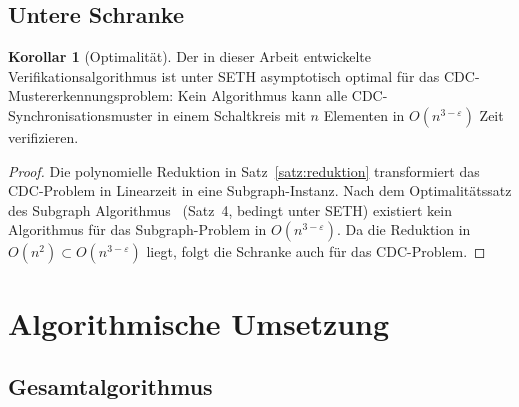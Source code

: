 ﻿\documentclass[a4paper,12pt]{article}
\theoremstyle{definition}
\newtheorem{korollar}{Korollar}
\begin{document}
	\subsection{Untere Schranke}
	
	\begin{korollar}[Optimalit\"at]
		Der in dieser Arbeit entwickelte Verifikationsalgorithmus ist unter SETH
		asymptotisch optimal f\"ur das CDC-Mustererkennungsproblem:
		Kein Algorithmus kann alle CDC-Synchronisationsmuster in einem
		Schaltkreis mit $n$ Elementen in $O(n^{3-\varepsilon})$ Zeit verifizieren.
	\end{korollar}
	
	\begin{proof}
		Die polynomielle Reduktion in Satz~\ref{satz:reduktion} transformiert
		das CDC-Problem in Linearzeit in eine Subgraph-Instanz.
		Nach dem Optimalit\"atssatz des Subgraph Algorithmus~\cite{epp2026subgraph}
		(Satz~4, bedingt unter SETH) existiert kein Algorithmus f\"ur das
		Subgraph-Problem in $O(n^{3-\varepsilon})$.
		Da die Reduktion in $O(n^2) \subset O(n^{3-\varepsilon})$ liegt,
		folgt die Schranke auch f\"ur das CDC-Problem. \qedhere
	\end{proof}
	
	\section{Algorithmische Umsetzung}
	
	\subsection{Gesamtalgorithmus}
	
\end{document}
